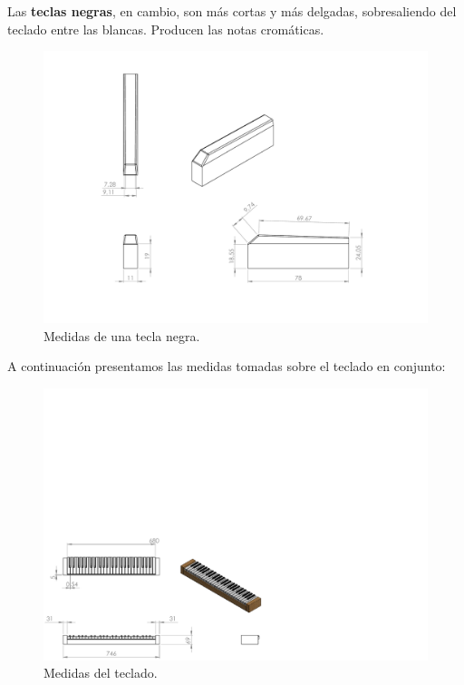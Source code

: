 \smallskip

Las \textbf{teclas negras}, en cambio, son más cortas y más delgadas, sobresaliendo del teclado entre las blancas. Producen las notas cromáticas.

\smallskip

\begin{figure}[H]
	\noindent \begin{centering}
		\includegraphics[clip=true,trim=50 50 50 50, width=\linewidth/2]{capitulo3/negra_modelo}
		\par\end{centering}
	\smallskip
	\caption{\label{fig:negra_modelo} Medidas de una tecla negra.}
\end{figure} 

\smallskip

A continuación presentamos las medidas tomadas sobre el teclado en conjunto:

\smallskip

\begin{figure}[H]
	\noindent \begin{centering}
		\includegraphics[clip=true,trim=0 0 360 320, width=\linewidth*3/4]{capitulo3/teclado_modelo}
		\par\end{centering}
	\smallskip
	\caption{\label{fig:teclado_modelo} Medidas del teclado.}
\end{figure} 

